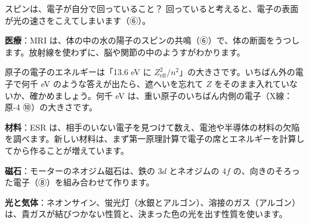 \begin{tsumazuki}{スピンは、電子が自分で回っていること？}
回っていると考えると、電子の表面が光の速さをこえてしまいます（⑥）。
\end{tsumazuki}

\begin{phkougaku}[電子の席とスピンを使う技術]
\textbf{医療}：MRI は、体の中の水の陽子のスピンの共鳴（⑥）で、体の断面をうつします。放射線を使わずに、脳や関節の中のようすがわかります。

\begin{phketa}[原子と分子のエネルギーの目安]
原子の電子のエネルギーは「13.6 eV に $Z_{\mathrm{eff}}^2/n^2$」の大きさです。いちばん外の電子で何千 eV のような答えが出たら、遮へいを忘れて $Z$ をそのまま入れていないか、確かめましょう。何千 eV は、重い原子のいちばん内側の電子（X線：原-4 ⑩）の大きさです。
\end{phketa}

\textbf{材料}：ESR は、相手のいない電子を見つけて数え、電池や半導体の材料の欠陥を調べます。新しい材料は、まず第一原理計算で電子の席とエネルギーを計算してから作ることが増えています。

\textbf{磁石}：モーターのネオジム磁石は、鉄の $3d$ とネオジムの $4f$ の、向きのそろった電子（⑧）を組み合わせて作ります。

\textbf{光と気体}：ネオンサイン、蛍光灯（水銀とアルゴン）、溶接のガス（アルゴン）は、貴ガスが結びつかない性質と、決まった色の光を出す性質を使います。


\end{phkougaku}

